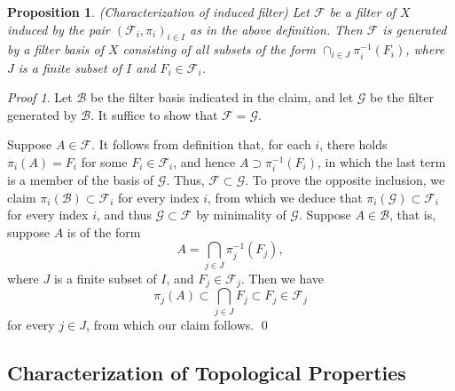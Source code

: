 \documentclass[a4paper,12pt]{article}
\newtheorem{prp}[thm]{Proposition}
\theoremstyle{remark}
\newtheorem*{prf}{Proof}
\theoremstyle{definition}
\theoremstyle{definition}
\theoremstyle{definition}
\begin{document}
\begin{prp}\label{characterize induced filter} (Characterization of induced filter)
	Let \( \mathscr{F} \) be a filter of \( X \) induced by the pair \( (\mathscr{F}_i ,\pi_i)_{i \in I} \) as in the above definition. Then \( \mathscr{F} \) is generated by a filter basis of \( X \) consisting of all subsets of the form \( \cap_{i \in J} \pi_i ^{-1}(F_i)\), where \( J \) is a finite subset of \( I \) and \( F_i \in \mathscr{F}_i \).
\end{prp}
\begin{prf}
	Let \( \mathscr{B} \) be the filter basis indicated in the claim, and let \( \mathscr{G} \) be the filter generated by \( \mathscr{B} \). It suffice to show that \( \mathscr{F}=\mathscr{G} \).

	Suppose \( A \in \mathscr{F}\). It follows from definition that, for each \( i \), there holds \( \pi_i(A) = F_i \) for some \( F_i \in \mathscr{F}_i \), and hence \( A \supset \pi_i ^{-1}(F_i) \), in which the last term is a member of the basis of \( \mathscr{G} \). Thus, \( \mathscr{F} \subset \mathscr{G} \). To prove the opposite inclusion, we claim \( \pi_i(\mathscr{B})\subset \mathscr{F}_i \) for every index \( i \), from which we deduce that \( \pi_i(\mathscr{G})\subset \mathscr{F}_i \) for every index \( i \), and thus \( \mathscr{G} \subset \mathscr{F} \) by minimality of \( \mathscr{G} \). Suppose \( A \in \mathscr{B}\), that is, suppose \( A \) is of the form
	\[
		A = \bigcap_{j \in J} \pi_j^{-1}(F_j),
	\]
	where \( J \) is a finite subset of \( I \), and \( F_j \in \mathscr{F}_j \). Then we have
	\[
		\pi_j(A) \subset \bigcap_{j \in J}F_j \subset F_j \in \mathscr{F}_j
	\]
	for every \( j \in J \), from which our claim follows.
	\qed\end{prf}

\subsection{Characterization of Topological Properties}
\end{document}
